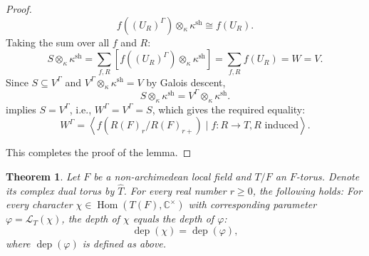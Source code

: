 \documentclass[american]{article}
\numberwithin{equation}{section}
\numberwithin{figure}{section}
\theoremstyle{plain}
\newtheorem{theorem}{Theorem}[section]
\theoremstyle{definition}
\theoremstyle{remark}
\begin{document}
\begin{proof}
     \[
     f\left((U_R)^\Gamma\right) \otimes_\kappa \kappa^{\text{sh}} \cong f(U_R).
     \]
Taking the sum over all \( f \) and \( R \):
     \[
     S \otimes_\kappa \kappa^{\text{sh}} = \sum_{f,R} \left[ f\left((U_R)^\Gamma\right) \otimes_\kappa \kappa^{\text{sh}} \right] = \sum_{f,R} f(U_R) = W = V.
     \]
Since \( S \subseteq V^\Gamma \) and \( V^\Gamma \otimes_\kappa \kappa^{\text{sh}} = V \) by Galois descent, \[
     S \otimes_\kappa \kappa^{\text{sh}} = V^\Gamma \otimes_\kappa \kappa^{\text{sh}}.
     \]
implies \( S = V^\Gamma \), i.e.,  \( W^\Gamma = V^\Gamma = S \), which gives the required equality:
     \[
     W^\Gamma = \left\langle f\left(R(F)_r / R(F)_{r+}\right) \mid f: R \to T,  R \text{ induced} \right\rangle.
     \]

 This completes the proof of the lemma. 
 \end{proof}
\begin{theorem}\label{thm:dep-r-LLC-forTori}
    Let \(F\) be a non-archimedean local field and \(T/F\) an \(F\)-torus. Denote its complex dual torus by \(\widehat{T}\). For every real number \(r \geq 0\), the following holds:
For every character \(\chi \in \operatorname{Hom}(T(F), \mathbb{C}^\times)\) with corresponding parameter \(\varphi = \mathcal{L}_T(\chi)\), the depth of \(\chi\) equals the depth of \(\varphi\):
   \[
   \operatorname{dep}(\chi) = \operatorname{dep}(\varphi),
   \]
where \(\operatorname{dep}(\varphi)\) is defined as above.
\end{theorem}
\end{document}
